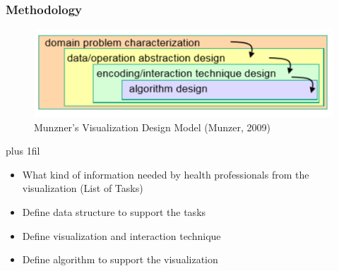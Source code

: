 \documentclass[xcolor=table]{beamer}
\makeatletter
\def\normaljustify{%
  \let\\\@centercr\rightskip\z@skip \leftskip\z@skip%
  \parfillskip=0pt plus 1fil}
\makeatother
\begin{document}
\begin{frame}
\frametitle{Methodology}
\centering
\begin{figure}
\includegraphics[scale=0.7]{images/munzner_model.png}
\caption{Munzner's Visualization Design Model (Munzer, 2009)}
\end{figure}

\normaljustify
\begin{itemize}
\item What kind of information needed by health professionals from the visualization (List of Tasks)
\item Define data structure to support the tasks
\item Define visualization and interaction technique
\item Define algorithm to support the visualization
\end{itemize}
\end{frame}

\end{document}
